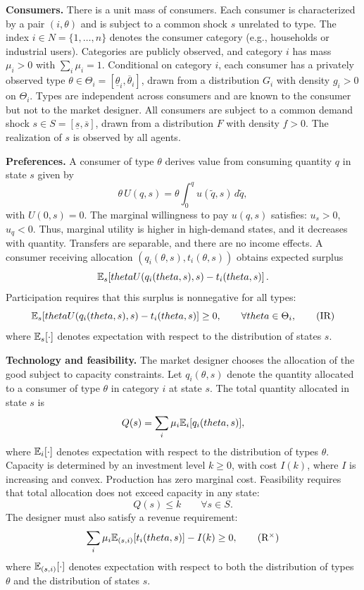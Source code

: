 \documentclass{class}
\begin{document}
\noindent\textbf{Consumers.}
There is a unit mass of consumers. Each consumer is characterized by a pair $(i,\theta)$ and is subject to a common shock $s$ unrelated to type. The index $i \in N = \{1,\dots,n\}$ denotes the consumer category (e.g., households or industrial users). Categories are publicly observed, and category $i$ has mass $\mu_i > 0$ with $\sum_i\mu_i=1$. Conditional on category $i$, each consumer has a privately observed type $\theta \in \Theta_i = [\underline{\theta}_i,\overline{\theta}_i]$, drawn from a distribution $G_i$ with density $g_i > 0$ on $\Theta_i$. Types are independent across consumers and are known to the consumer but not to the market designer. All consumers are subject to a common demand shock $s \in S = [\underline{s},\overline{s}]$, drawn from a distribution $F$ with density $f > 0$. The realization of $s$ is observed by all agents.

\noindent\textbf{Preferences.}
A consumer of type $\theta$ derives value from consuming quantity $q$ in state $s$ given by
\[
\theta \, U(q,s) = \theta \int_0^q u(\tilde q,s)\, d\tilde q,
\]
with $U(0,s)=0$. The marginal willingness to pay $u(q,s)$ satisfies: $u_s > 0$, $u_q < 0$. Thus, marginal utility is higher in high-demand states, and it decreases with quantity. Transfers are separable, and there are no income effects. A consumer receiving allocation $(q_i(\theta,s), t_i(\theta,s))$ obtains expected surplus
\[
\mathbb{E}_s\!\left[theta U(q_i(theta,s),s) - t_i(theta,s)\right].
\]
Participation requires that this surplus is nonnegative for all types:
\begin{equation}
\mathbb{E}_s\!\left[theta U(q_i(theta,s),s) - t_i(theta,s)\right] \ge 0,
\qquad \forall theta \in \Theta_i,
\tag{IR}\label{IR-def}
\end{equation}
where $\mathbb{E}_s[\cdot]$ denotes expectation with respect to the distribution of states $s$.

\noindent\textbf{Technology and feasibility.}
The market designer chooses the allocation of the good subject to capacity constraints. Let $q_i(\theta,s)$ denote the quantity allocated to a consumer of type $\theta$ in category $i$ at state $s$. The total quantity allocated in state $s$ is
\[
Q(s) = \sum_i \mu_i \mathbb{E}_{i}[q_i(theta,s)],
\]
where $\mathbb{E}_i[\cdot]$ denotes expectation with respect to the distribution of types $\theta$. Capacity is determined by an investment level $k \ge 0$, with cost $I(k)$, where $I$ is increasing and convex. Production has zero marginal cost. Feasibility requires that total allocation does not exceed capacity in any state:
\begin{equation}
Q(s) \le k \qquad \forall s \in S.
\tag{K}\label{K-def}
\end{equation}
The designer must also satisfy a revenue requirement:
\begin{equation}
\sum_i\mu_i
\mathbb{E}_{(s,i)}\!\left[t_i(theta,s)\right] - I(k) \ge 0,
\tag{R$^\times$}\label{R-def}
\end{equation}
where $\mathbb{E}_{(s,i)}[\cdot]$ denotes expectation with respect to both the distribution of types $\theta$ and the distribution of states $s$.
\end{document}
